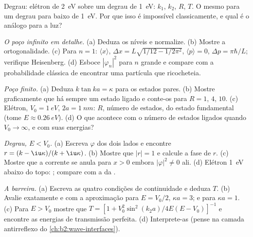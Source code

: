 \begin{exercise}[$\star$]\label{exo:b2:potential-wells-tunneling:4}
Degrau: elétron de \qty{2}{eV} sobre um degrau de \qty{1}{eV}: $k_1$, $k_2$,
$R$, $T$. O mesmo para um degrau para baixo de \qty{1}{eV}. Por que isso é impossível
classicamente, e qual é o análogo para a luz?
\end{exercise}

\begin{exercise}[$\star\star$]\label{exo:b2:potential-wells-tunneling:5}
\emph{O poço infinito em detalhe.} (a) Deduza os níveis e normalize.
(b) Mostre a ortogonalidade. (c) Para $n = 1$: $\langle x\rangle$, $\Delta x =
L\sqrt{1/12 - 1/2\pi^2}$, $\langle p\rangle = 0$, $\Delta p = \pi\hbar/L$; verifique
Heisenberg. (d) Esboce $|\varphi_n|^2$ para $n$ grande e compare com a
probabilidade clássica de encontrar uma partícula que ricocheteia.
\end{exercise}

\begin{exercise}[$\star\star$]\label{exo:b2:potential-wells-tunneling:6}
\emph{Poço finito.} (a) Deduza $k\tan ka = \kappa$ para os estados pares.
(b) Mostre graficamente que há sempre um estado ligado e conte-os para
$R = 1$, $4$, $10$. (c) Elétron, $V_0 = \qty{1}{eV}$, $2a = \qty{1}{nm}$:
$R$, número de estados,  do estado fundamental (tome
$E \approx \qty{0.26}{eV}$). (d) O que acontece com o número de estados ligados
quando $V_0 \to \infty$, e com suas energias?
\end{exercise}

\begin{exercise}[$\star\star$]\label{exo:b2:potential-wells-tunneling:7}
\emph{Degrau, $E < V_0$.} (a) Escreva $\varphi$ dos dois lados e encontre $r =
(k - \iu\kappa)/(k + \iu\kappa)$. (b) Mostre que $|r| = 1$ e calcule a fase
de $r$. (c) Mostre que a corrente se anula para $x > 0$ embora $|\varphi|^2 \ne
0$ ali. (d) Elétron \qty{1}{eV} abaixo do topo: ;
compare com a  da .
\end{exercise}

\begin{exercise}[$\star\star$]\label{exo:b2:potential-wells-tunneling:8}
\emph{A barreira.} (a) Escreva as quatro condições de continuidade e
deduza $T$. (b) Avalie exatamente e com a aproximação para $E =
V_0/2$, $\kappa a = 3$; e para $\kappa a = 1$. (c) Para $E > V_0$ mostre que $T = [1 +
V_0^2\sin^2(k_2a)/4E(E - V_0)]^{-1}$ e encontre as energias de transmissão
perfeita. (d) Interprete-as (pense na camada antirreflexo do
\cref{ch:b2:wave-interfaces}).
\end{exercise}

